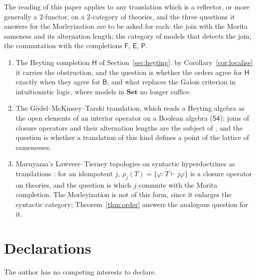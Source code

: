 \documentclass[11pt]{amsart}
\theoremstyle{definition}
\newcommand{\Set}{\mathbf{Set}}
\newcommand{\FF}{\mathsf F}
\newcommand{\EE}{\mathsf E}
\newcommand{\PP}{\mathsf P}
\newcommand{\BB}{\mathsf B}
\begin{document}
The reading of this paper applies to any translation which is a
reflector, or more generally a $2$-functor, on a $2$-category of
theories, and the three questions it answers for the Morleyization are
to be asked for each: the join with the Morita sameness and its
alternation length; the category of models that detects the join; the
commutation with the completions $\FF$, $\EE$, $\PP$.
\begin{enumerate}
\item The Heyting completion $\mathsf H$ of
Section~\ref{sec:heyting}: by Corollary~\ref{cor:localise} it carries the
obstruction, and the question is whether the orders agree for $\mathsf
H$ exactly when they agree for $\BB$, and what replaces the Galois
criterion in intuitionistic logic, where models in $\Set$ no longer
suffice.
\item The G\"odel--McKinsey--Tarski translation, which reads a Heyting
algebra as the open elements of an interior operator on a Boolean
algebra ($\mathsf{S4}$); joins of closure operators and their
alternation lengths are the subject of \cite{Fijoin}, and the question
is whether a translation of this kind defines a point of the lattice of
samenesses.
\item Maruyama's Lawvere--Tierney topologies on syntactic
hyperdoctrines as translations \cite[\S4.10]{Maruyama16}: for an
idempotent $j$, $\rho_j(T)=\{\varphi: T\vdash j\varphi\}$ is a closure
operator on theories, and the question is which $j$ commute with the
Morita completion. The Morleyization is not of this form, since it
enlarges the syntactic category; Theorem~\ref{thm:order} answers the
analogous question for it.
\end{enumerate}

\section*{Declarations}
The author has no competing interests to declare.
\end{document}
